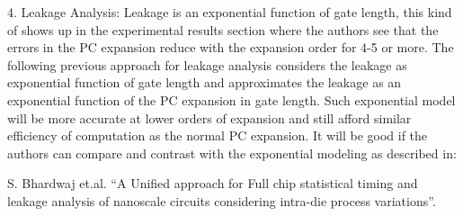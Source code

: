 \begin{reviewer}
4. Leakage Analysis: Leakage is an exponential function of gate length, this kind of shows up in the experimental results section where the authors see that the errors in the PC expansion reduce with the expansion order for 4-5 or more. The following previous approach for leakage analysis considers the leakage as exponential function of gate length and approximates the leakage as an exponential function of the PC expansion in gate length. Such exponential model will be more accurate at lower orders of expansion and still afford similar efficiency of computation as the normal PC expansion. It will be good if the authors can compare and contrast with the exponential modeling as described in:

S. Bhardwaj et.al. ``A Unified approach for Full chip statistical timing and leakage analysis of nanoscale circuits considering intra-die process variations''.
\end{reviewer}
